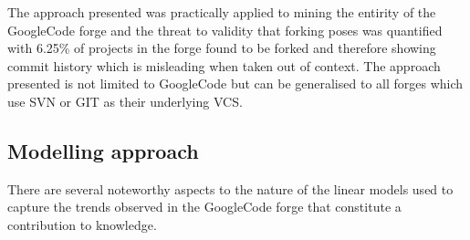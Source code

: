 \begin{itemize}
The approach presented was practically applied to mining the entirity of the GoogleCode forge and the threat to validity that forking poses was quantified with 6.25\% of projects in the forge found to be forked and therefore showing commit history which is misleading when taken out of context. The approach presented is not limited to GoogleCode but can be generalised to all forges which use SVN or GIT as their underlying VCS.
\end{itemize}

\subsection{Modelling approach}
There are several noteworthy aspects to the nature of the linear models used to capture the trends observed in the GoogleCode forge that constitute a contribution to knowledge.

